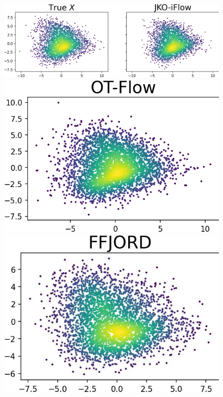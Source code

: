 \documentclass{article}
\theoremstyle{remark}
\theoremstyle{plain}
\begin{document}
{\begin{figure}[!t]
    \begin{minipage}{0.335\textwidth}
        \includegraphics[width=\linewidth]{MINIBOONE_PCA_2D_compare.png}
    \end{minipage}
    \begin{minipage}{0.16\textwidth}
        \vspace{-0.2in}\includegraphics[width=\linewidth]{MINIBOONE_PCA_2D_compare_OTFlow.png}
    \end{minipage}
    \begin{minipage}{0.155\textwidth}
        \vspace{-0.2in}\includegraphics[width=\linewidth]{MINIBOONE_PCA_2D_compare_FFJORD.png}

\end{minipage}
\end{figure}}
\end{document}
